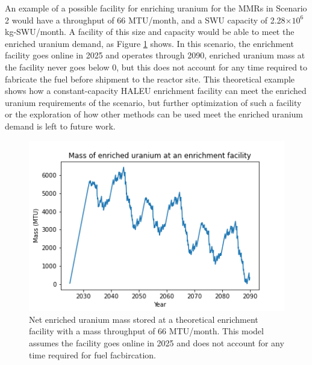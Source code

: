 An example of a possible facility for enriching uranium for the \glspl{MMR} in 
Scenario 2 would 
have a throughput of 66 MTU/month, and a \gls{SWU} capacity of 2.28$\times 10^6$
kg-SWU/month. A facility of this size and capacity would be able to meet the 
enriched uranium demand, as Figure \ref{fig:enrich_storage}
shows. In this scenario, the enrichment facility goes online in 2025 and operates 
through 2090, enriched uranium mass at the facility never goes below 0, but this does not 
account for any time required to fabricate the fuel before shipment to the reactor 
site. This theoretical example shows how a constant-capacity \gls{HALEU} enrichment 
facility can meet the enriched uranium requirements of the scenario, but further 
optimization of such a facility or the exploration of how other methods can be
used meet the enriched uranium demand is left to future work. 

\begin{figure}
    \centering
    \includegraphics[width=\textwidth]{../figures/potential_uranium_stockpile.png}
    \caption{Net enriched uranium mass stored at a theoretical enrichment facility with 
    a mass throughput of 66 MTU/month. This model assumes the facility goes online in 2025
    and does not account for any time required for fuel facbircation.}
    \label{fig:enrich_storage}
\end{figure}